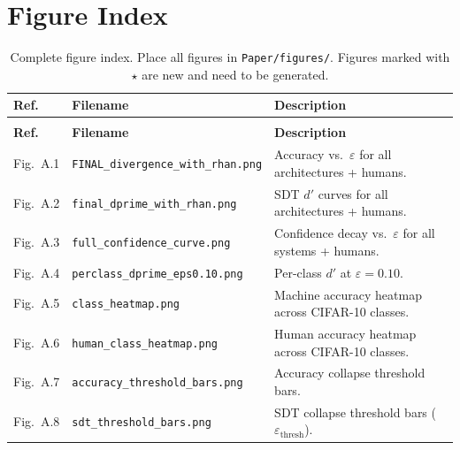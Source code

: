 \documentclass[12pt,a4paper]{article}
\begin{document}
\newpage
\appendix

\section{Figure Index}
\label{app:figures}

\begingroup\small
\setlength{\tabcolsep}{4pt}
\renewcommand{\arraystretch}{1.1}
\begin{longtable}{>{\raggedright\arraybackslash}p{2.1cm} >{\raggedright\arraybackslash}p{5.2cm} >{\raggedright\arraybackslash}p{\dimexpr\textwidth-2.1cm-5.2cm-4\tabcolsep\relax}}
\caption{Complete figure index. Place all figures in
\texttt{Paper/figures/}. Figures marked with $\star$ are new and
need to be generated. \label{tab:fig_index}} \\
\toprule
\textbf{Ref.} & \textbf{Filename} & \textbf{Description} \\
\midrule
\endfirsthead
\multicolumn{3}{c}{{\bfseries Table \thetable\ (continued)}} \\
\toprule
\textbf{Ref.} & \textbf{Filename} & \textbf{Description} \\
\midrule
\endhead
\bottomrule
\endfoot
\bottomrule
\endlastfoot
Fig.~A.1 & \texttt{FINAL\_\allowbreak{}divergence\_\allowbreak{}with\_\allowbreak{}rhan.png} &
Accuracy vs.\ $\varepsilon$ for all architectures + humans. \\
Fig.~A.2 & \texttt{final\_\allowbreak{}dprime\_\allowbreak{}with\_\allowbreak{}rhan.png} &
SDT $d'$ curves for all architectures + humans. \\
Fig.~A.3 & \texttt{full\_\allowbreak{}confidence\_\allowbreak{}curve.png} &
Confidence decay vs.\ $\varepsilon$ for all systems + humans. \\
Fig.~A.4 & \texttt{perclass\_\allowbreak{}dprime\_\allowbreak{}eps0.10.png} &
Per-class $d'$ at $\varepsilon = 0.10$. \\
Fig.~A.5 & \texttt{class\_\allowbreak{}heatmap.png} &
Machine accuracy heatmap across CIFAR-10 classes. \\
Fig.~A.6 & \texttt{human\_\allowbreak{}class\_\allowbreak{}heatmap.png} &
Human accuracy heatmap across CIFAR-10 classes. \\
Fig.~A.7 & \texttt{accuracy\_\allowbreak{}threshold\_\allowbreak{}bars.png} &
Accuracy collapse threshold bars. \\
Fig.~A.8 & \texttt{sdt\_\allowbreak{}threshold\_\allowbreak{}bars.png} &
SDT collapse threshold bars ($\varepsilon_{\text{thresh}}$). \\

\end{longtable}
\end{document}
